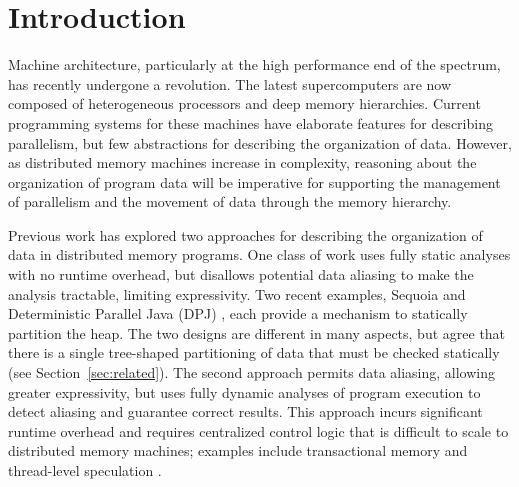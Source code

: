 

\section{Introduction}
\label{sec:intro}

Machine architecture, particularly at the high
performance end of the spectrum, has recently undergone a revolution.  The
latest supercomputers are now composed of heterogeneous processors
and deep memory hierarchies.  Current programming systems for these
machines have elaborate features for describing parallelism, but 
few abstractions for describing the organization of data.  However, as 
distributed memory machines increase in complexity,
reasoning about the organization of program data will be imperative
for supporting the management of parallelism and the movement of data
through the memory hierarchy.



Previous work has explored two approaches for describing the organization of data
in distributed memory programs.
One class of work uses fully static analyses with no runtime overhead, but 
disallows potential data aliasing to make the analysis tractable, limiting expressivity.
Two recent examples, Sequoia \cite{Fatahalian06} and 
Deterministic Parallel Java (DPJ) \cite{Bocchino09}, each provide a 
mechanism to statically partition the heap.
The two designs are different in many aspects, but agree that there is
a single tree-shaped partitioning of data that must be checked statically 
(see Section~\ref{sec:related}).  The second approach permits data
aliasing, allowing greater expressivity, but uses fully dynamic analyses of
program execution to detect aliasing and guarantee correct results.
This approach incurs significant runtime overhead and requires 
centralized control logic that is difficult to scale to distributed 
memory machines; examples include transactional memory \cite{Harris05} 
and thread-level speculation \cite{Steffan00}.

